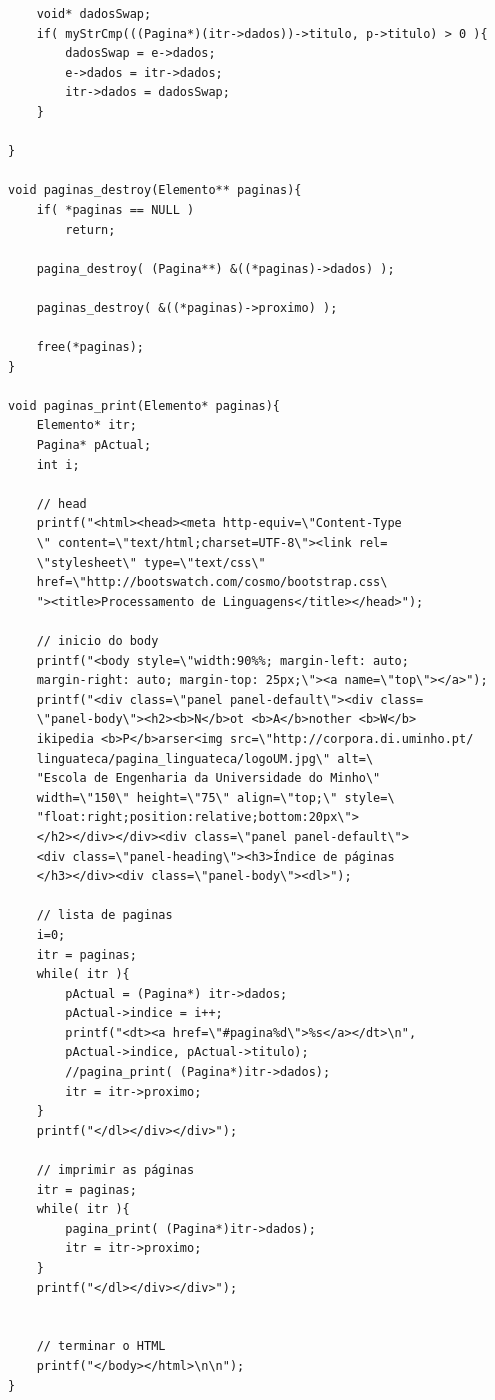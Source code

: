 \documentclass[11pt, a4paper, oneside]{article}
\begin{document}
\begin{verbatim}
    void* dadosSwap;
    if( myStrCmp(((Pagina*)(itr->dados))->titulo, p->titulo) > 0 ){
        dadosSwap = e->dados;
        e->dados = itr->dados;
        itr->dados = dadosSwap;
    }
        
}

void paginas_destroy(Elemento** paginas){
    if( *paginas == NULL )
        return;
    
    pagina_destroy( (Pagina**) &((*paginas)->dados) );

    paginas_destroy( &((*paginas)->proximo) );
    
    free(*paginas);
}

void paginas_print(Elemento* paginas){
    Elemento* itr;
    Pagina* pActual;
    int i;
    
    // head
    printf("<html><head><meta http-equiv=\"Content-Type
    \" content=\"text/html;charset=UTF-8\"><link rel=
    \"stylesheet\" type=\"text/css\" 
    href=\"http://bootswatch.com/cosmo/bootstrap.css\
    "><title>Processamento de Linguagens</title></head>");
    
    // inicio do body
    printf("<body style=\"width:90%%; margin-left: auto; 
    margin-right: auto; margin-top: 25px;\"><a name=\"top\"></a>");
    printf("<div class=\"panel panel-default\"><div class=
    \"panel-body\"><h2><b>N</b>ot <b>A</b>nother <b>W</b>
    ikipedia <b>P</b>arser<img src=\"http://corpora.di.uminho.pt/
    linguateca/pagina_linguateca/logoUM.jpg\" alt=\
    "Escola de Engenharia da Universidade do Minho\" 
    width=\"150\" height=\"75\" align=\"top;\" style=\
    "float:right;position:relative;bottom:20px\">
    </h2></div></div><div class=\"panel panel-default\">
    <div class=\"panel-heading\"><h3>Índice de páginas
    </h3></div><div class=\"panel-body\"><dl>");
    
    // lista de paginas
    i=0;
    itr = paginas;
    while( itr ){
        pActual = (Pagina*) itr->dados;
        pActual->indice = i++;
        printf("<dt><a href=\"#pagina%d\">%s</a></dt>\n", 
        pActual->indice, pActual->titulo);
        //pagina_print( (Pagina*)itr->dados);
        itr = itr->proximo;
    }
    printf("</dl></div></div>");
    
    // imprimir as páginas
    itr = paginas;
    while( itr ){
        pagina_print( (Pagina*)itr->dados);
        itr = itr->proximo;
    }
    printf("</dl></div></div>");
    
    
    // terminar o HTML
    printf("</body></html>\n\n");
}
\end{verbatim}
\newpage
\end{document}
